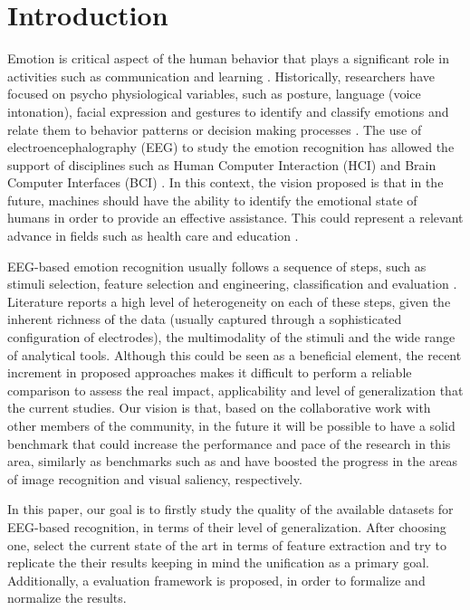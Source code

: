 \documentclass{sig-alternate}
\begin{document}
\section{Introduction}
Emotion is critical aspect of the human behavior that plays 
a  significant role in  activities such as communication and 
learning \cite{}.  Historically, researchers have focused on psycho 
physiological variables, such as posture, language 
(voice intonation), facial expression and gestures to identify 
and classify emotions and relate them to behavior patterns 
 or decision making processes \cite{}.
The use of electroencephalography (EEG) to study the 
emotion recognition  has allowed the 
support of disciplines such as Human Computer Interaction 
(HCI) and Brain Computer Interfaces (BCI) \cite{}. In this context, 
the vision proposed is that in the future, machines should 
have the ability to identify the emotional state of humans 
in order to provide an effective assistance. This could 
represent a relevant advance in fields such as health care 
and education \cite{}.

EEG-based emotion recognition usually follows a sequence 
of steps, such as  stimuli selection, feature selection and 
engineering, classification and evaluation \cite{}. Literature reports 
a high level of heterogeneity on each of these steps, given 
the inherent richness of the data (usually captured through 
a sophisticated configuration of electrodes), the multimodality 
of the stimuli and the wide range of analytical tools. Although 
this could be seen as a beneficial element, the recent increment
 in proposed approaches makes it difficult to perform a reliable 
comparison to assess the real impact, applicability  and level 
of generalization that the current studies.  Our vision is that, 
based on the collaborative work with other members of the 
community, in the future it will be possible to have a solid 
benchmark that could increase the performance and pace 
of the research in this area, similarly as benchmarks such 
as  \cite{ILSVRC15} and \cite{Judd_2012} have boosted 
the progress in the areas of image recognition and visual 
saliency, respectively. 

In this paper, our  goal is to firstly  study the quality of 
the available datasets for EEG-based recognition, in 
terms of their level of generalization. After choosing 
one, select the current state of the art  in terms of feature
 extraction and try to replicate the their results keeping  
 in mind the unification as a primary goal. Additionally, a 
 evaluation framework is proposed, in order to formalize 
 and normalize the results.  
 
\end{document}
